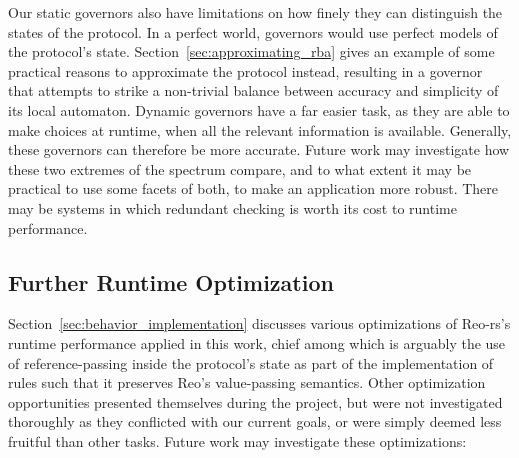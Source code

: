 Our static governors also have limitations on how finely they can distinguish the states of the protocol. In a perfect world, governors would use perfect models of the protocol's state. Section~\ref{sec:approximating_rba} gives an example of some practical reasons to approximate the protocol instead, resulting in a governor that attempts to strike a non-trivial balance between accuracy and simplicity of its local automaton. Dynamic governors have a far easier task, as they are able to make choices at runtime, when all the relevant information is available. Generally, these governors can therefore be more accurate. Future work may investigate how these two extremes of the spectrum compare, and to what extent it may be practical to use some facets of both, to make an application more robust. There may be systems in which redundant checking is worth its cost to runtime performance.

\subsection{Further Runtime Optimization}
Section~\ref{sec:behavior_implementation} discusses various optimizations of Reo-rs's runtime performance applied in this work, chief among which is arguably the use of reference-passing inside the protocol's state as part of the implementation of rules such that it preserves Reo's value-passing semantics. Other optimization opportunities presented themselves during the project, but were not investigated thoroughly as they conflicted with our current goals, or were simply deemed less fruitful than other tasks. Future work may investigate these optimizations:

